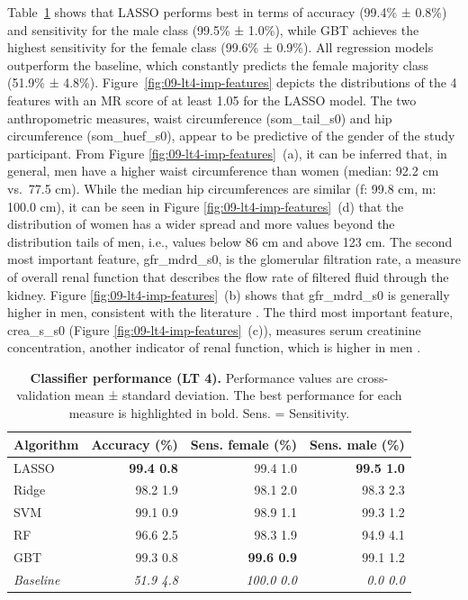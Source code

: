 \documentclass[
  oneside]{book}
\begin{document}
Table~\ref{tab:09-performance-4} shows that LASSO performs best in terms of accuracy (99.4\% ± 0.8\%) and sensitivity for the male class (99.5\% ± 1.0\%), while GBT achieves the highest sensitivity for the female class (99.6\% ± 0.9\%).
All regression models outperform the baseline, which constantly predicts the female majority class (51.9\% ± 4.8\%).
Figure~\ref{fig:09-lt4-imp-features} depicts the distributions of the 4 features with an MR score of at least 1.05 for the LASSO model.
The two anthropometric measures, waist circumference (som\_tail\_s0) and hip circumference (som\_huef\_s0), appear to be predictive of the gender of the study participant.
From Figure \ref{fig:09-lt4-imp-features}~(a), it can be inferred that, in general, men have a higher waist circumference than women (median: 92.2 cm vs.~77.5 cm).
While the median hip circumferences are similar (f: 99.8 cm, m: 100.0 cm), it can be seen in Figure \ref{fig:09-lt4-imp-features}~(d) that the distribution of women has a wider spread and more values beyond the distribution tails of men, i.e., values below 86 cm and above 123 cm.
The second most important feature, gfr\_mdrd\_s0, is the glomerular filtration rate, a measure of overall renal function that describes the flow rate of filtered fluid through the kidney.
Figure \ref{fig:09-lt4-imp-features}~(b) shows that gfr\_mdrd\_s0 is generally higher in men, consistent with the literature \autocite{hannemann2012age}.
The third most important feature, crea\_s\_s0 (Figure \ref{fig:09-lt4-imp-features}~(c)), measures serum creatinine concentration, another indicator of renal function, which is higher in men \autocite{crea}.



\begin{table}

\caption{\label{tab:09-performance-4}\textbf{Classifier performance (LT 4).} Performance values are cross-validation mean ± standard deviation. The best performance for each measure is highlighted in bold. Sens. = Sensitivity.}
\centering
\begin{tabular}[t]{lrrr}
\toprule
\textbf{Algorithm} & \textbf{Accuracy (\%)} & \textbf{Sens. female (\%)} & \textbf{Sens. male (\%)}\\
\midrule
LASSO & \textbf{99.4 \textpm{} 0.8} & 99.4 \textpm{} 1.0 & \textbf{99.5 \textpm{} 1.0}\\
Ridge & 98.2 \textpm{} 1.9 & 98.1 \textpm{} 2.0 & 98.3 \textpm{} 2.3\\
SVM & 99.1 \textpm{} 0.9 & 98.9 \textpm{} 1.1 & 99.3 \textpm{} 1.2\\
RF & 96.6 \textpm{} 2.5 & 98.3 \textpm{} 1.9 & 94.9 \textpm{} 4.1\\
GBT & 99.3 \textpm{} 0.8 & \textbf{99.6 \textpm{} 0.9} & 99.1 \textpm{} 1.2\\
\midrule
\addlinespace
\em{Baseline} & \em{51.9 \textpm{} 4.8} & \em{100.0 \textpm{} 0.0} & \em{0.0 \textpm{} 0.0}\\
\bottomrule
\end{tabular}
\end{table}
\end{document}
